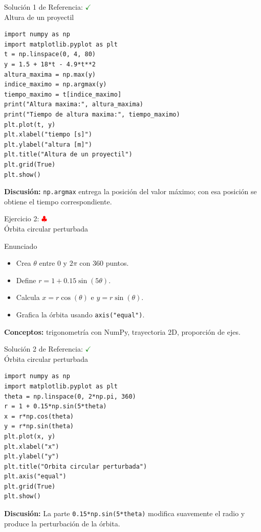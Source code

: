 \documentclass[10pt]{beamer}
\begin{document}
\begin{solutionblock}
\begin{frame}[fragile]{Solución 1 de Referencia: \hfill \textcolor{green}{$\checkmark$} \\ Altura de un proyectil}
\begin{verbatim}
import numpy as np
import matplotlib.pyplot as plt
t = np.linspace(0, 4, 80)
y = 1.5 + 18*t - 4.9*t**2
altura_maxima = np.max(y)
indice_maximo = np.argmax(y)
tiempo_maximo = t[indice_maximo]
print("Altura maxima:", altura_maxima)
print("Tiempo de altura maxima:", tiempo_maximo)
plt.plot(t, y)
plt.xlabel("tiempo [s]")
plt.ylabel("altura [m]")
plt.title("Altura de un proyectil")
plt.grid(True)
plt.show()
\end{verbatim}
\textbf{Discusión:} \texttt{np.argmax} entrega la posición del valor máximo; con esa posición se obtiene el tiempo correspondiente.
\end{frame}
\end{solutionblock}

\begin{frame}{Ejercicio 2: \hfill \textcolor{red}{$\clubsuit$} \\ Órbita circular perturbada}
\begin{block}{Enunciado}
\begin{itemize}
  \item Crea \(\theta\) entre 0 y \(2\pi\) con 360 puntos.
  \item Define \(r=1+0.15\sin(5\theta)\).
  \item Calcula \(x=r\cos(\theta)\) e \(y=r\sin(\theta)\).
  \item Grafica la órbita usando \texttt{axis("equal")}.
\end{itemize}
\end{block}
\textbf{Conceptos:} trigonometría con NumPy, trayectoria 2D, proporción de ejes.
\end{frame}

\begin{solutionblock}
\begin{frame}[fragile]{Solución 2 de Referencia: \hfill \textcolor{green}{$\checkmark$} \\ Órbita circular perturbada}
\begin{verbatim}
import numpy as np
import matplotlib.pyplot as plt
theta = np.linspace(0, 2*np.pi, 360)
r = 1 + 0.15*np.sin(5*theta)
x = r*np.cos(theta)
y = r*np.sin(theta)
plt.plot(x, y)
plt.xlabel("x")
plt.ylabel("y")
plt.title("Orbita circular perturbada")
plt.axis("equal")
plt.grid(True)
plt.show()
\end{verbatim}
\textbf{Discusión:} La parte \texttt{0.15*np.sin(5*theta)} modifica suavemente el radio y produce la perturbación de la órbita.
\end{frame}
\end{solutionblock}
\end{document}
